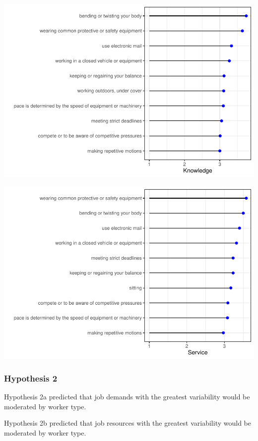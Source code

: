 \documentclass[
  english,
  man]{apa6}
\begin{document}
\includegraphics{SIOPjdr2_files/figure-latex/unnamed-chunk-8-1.pdf}

\includegraphics{SIOPjdr2_files/figure-latex/unnamed-chunk-9-1.pdf}

\hypertarget{hypothesis-2}{%
\subsubsection{Hypothesis 2}\label{hypothesis-2}}

Hypothesis 2a predicted that job demands with the greatest variability would be moderated by worker type.

Hypothesis 2b predicted that job resources with the greatest variability would be moderated by worker type.
\end{document}
